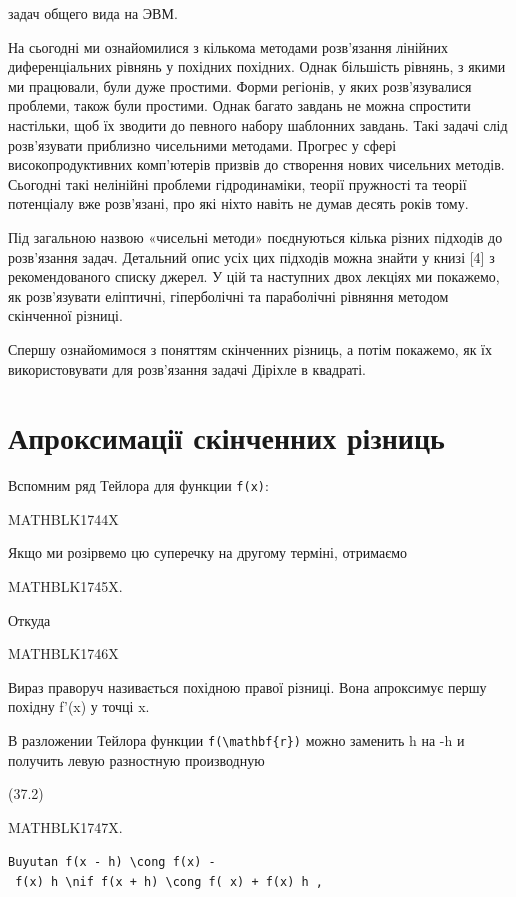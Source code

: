 \documentclass[
  ukrainian,
]{article}
\begin{document}
задач общего вида на ЭВМ.

На сьогодні ми ознайомилися з кількома методами розв'язання лінійних
диференціальних рівнянь у похідних похідних. Однак більшість рівнянь, з
якими ми працювали, були дуже простими. Форми регіонів, у яких
розв'язувалися проблеми, також були простими. Однак багато завдань не
можна спростити настільки, щоб їх зводити до певного набору шаблонних
завдань. Такі задачі слід розв'язувати приблизно чисельними методами.
Прогрес у сфері високопродуктивних комп'ютерів призвів до створення
нових чисельних методів. Сьогодні такі нелінійні проблеми гідродинаміки,
теорії пружності та теорії потенціалу вже розв'язані, про які ніхто
навіть не думав десять років тому.

Під загальною назвою «чисельні методи» поєднуються кілька різних
підходів до розв'язання задач. Детальний опис усіх цих підходів можна
знайти у книзі {[}4{]} з рекомендованого списку джерел. У цій та
наступних двох лекціях ми покажемо, як розв'язувати еліптичні,
гіперболічні та параболічні рівняння методом скінченної різниці.

Спершу ознайомимося з поняттям скінченних різниць, а потім покажемо, як
їх використовувати для розв'язання задачі Діріхле в квадраті.

\section{Апроксимації скінченних
різниць}\label{ux430ux43fux440ux43eux43aux441ux438ux43cux430ux446ux456ux457-ux441ux43aux456ux43dux447ux435ux43dux43dux438ux445-ux440ux456ux437ux43dux438ux446ux44c}

Вспомним ряд Тейлора для функции \texttt{f(x)}:

MATHBLK1744X

Якщо ми розірвемо цю суперечку на другому терміні, отримаємо

MATHBLK1745X.

Откуда

MATHBLK1746X

Вираз праворуч називається похідною правої різниці. Вона апроксимує
першу похідну f'(x) у точці x.

В разложении Тейлора функции \texttt{f(\textbackslash{}mathbf\{r\})}
можно заменить h на -h и получить левую разностную производную

(37.2)

MATHBLK1747X.

\texttt{Buyutan\ \textquotesingle{}f(x\ -\ h)\ \textbackslash{}cong\ f(x)\ -\ f\textquotesingle{}(x)\ h\textquotesingle{}\ \textbackslash{}nif\ \textquotesingle{}f(x\ +\ h)\ \textbackslash{}cong\ f(\ x)\ +\ f\textquotesingle{}(x)\ h\textquotesingle{}\ ,}
\end{document}
